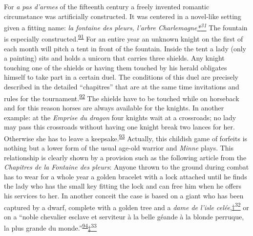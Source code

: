 For \emph{a pas d'armes} of the fifteenth century a freely invented
romantic circumstance was artificially constructed. It was centered in a
novel-like setting given a fitting name: \emph{la fontaine des pleurs,
l'arbre
Charlemagne\protect\hypertarget{10_Chapter_Three__THE_HEROIC_DREAM.xhtmlux5cux23id_2523}{\protect\hyperlink{23_NOTES.xhtmlux5cux23id_2524}{*\textsuperscript{31}}}}
The fountain is especially
constructed.\textsuperscript{\protect\hypertarget{10_Chapter_Three__THE_HEROIC_DREAM.xhtmlux5cux23id_1752}{\protect\hyperlink{23_NOTES.xhtmlux5cux23id_1753}{91}}}
For an entire year an unknown knight on the first of each month will
pitch a tent in front of the fountain. Inside the tent a lady (only a
painting) sits and holds a unicorn that carries three shields. Any
knight touching one of the shields or having them touched by his herald
obligates himself to take part in a certain duel. The conditions of this
duel are precisely described in the detailed ``chapitres'' that are at
the same time invitations and rules for the
tournament.\textsuperscript{\protect\hypertarget{10_Chapter_Three__THE_HEROIC_DREAM.xhtmlux5cux23id_1750}{\protect\hyperlink{23_NOTES.xhtmlux5cux23id_1751}{92}}}
The shields have to be touched while on horseback and for this reason
horses are always available for the knights. In another example: at the
\emph{Emprise du dragon} four knights wait at a crossroads; no lady may
pass this crossroads without having one knight break two lances for her.
Otherwise she has to leave a
keepsake.\textsuperscript{\protect\hypertarget{10_Chapter_Three__THE_HEROIC_DREAM.xhtmlux5cux23id_1749}{\protect\hyperlink{23_NOTES.xhtmlux5cux23page_408}{93}}}
Actually, this childish game of forfeits is nothing but a lower form of
the usual age-old warrior and \emph{Minne} plays. This relationship is
clearly shown by a provision such as the following article from the
\emph{Chapitres de la Fontaine des pleurs}: Anyone thrown to the ground
during combat has to wear for a whole year a golden bracelet with a lock
attached until he finds the lady who has the small key fitting the lock
and can free him when he offers his services to her. In another conceit
the case is based on a giant who has been captured by a dwarf, complete
with a golden tree and a \emph{dame de l'isle
celée},\protect\hypertarget{10_Chapter_Three__THE_HEROIC_DREAM.xhtmlux5cux23id_2526}{\protect\hyperlink{23_NOTES.xhtmlux5cux23id_2525}{†\textsuperscript{32}}}
or on a ``noble chevalier esclave et serviteur à la belle géande à la
blonde perruque, la plus grande du
monde.''\textsuperscript{\protect\hypertarget{10_Chapter_Three__THE_HEROIC_DREAM.xhtmlux5cux23id_1747}{\protect\hyperlink{23_NOTES.xhtmlux5cux23id_1748}{94}}}\protect\hypertarget{10_Chapter_Three__THE_HEROIC_DREAM.xhtmlux5cux23id_2527}{\protect\hyperlink{23_NOTES.xhtmlux5cux23id_2528}{‡\textsuperscript{33}}}
